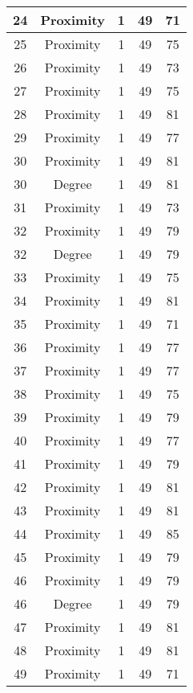 \documentclass[results.tex]{subfiles}
\begin{document}
\begin{center}
\begin{tabular}{| c || c | c | c | c |}
    \hline
    24 & Proximity & 1 & 49 & 71 \\ 
    \hline
    25 & Proximity & 1 & 49 & 75 \\ 
    \hline
    26 & Proximity & 1 & 49 & 73 \\ 
    \hline
    27 & Proximity & 1 & 49 & 75 \\ 
    \hline
    28 & Proximity & 1 & 49 & 81 \\ 
    \hline
    29 & Proximity & 1 & 49 & 77 \\ 
    \hline
    30 & Proximity & 1 & 49 & 81 \\ 
    \hline
    30 & Degree & 1 & 49 & 81 \\ 
    \hline
    31 & Proximity & 1 & 49 & 73 \\ 
    \hline
    32 & Proximity & 1 & 49 & 79 \\ 
    \hline
    32 & Degree & 1 & 49 & 79 \\ 
    \hline
    33 & Proximity & 1 & 49 & 75 \\ 
    \hline
    34 & Proximity & 1 & 49 & 81 \\ 
    \hline
    35 & Proximity & 1 & 49 & 71 \\ 
    \hline
    36 & Proximity & 1 & 49 & 77 \\ 
    \hline
    37 & Proximity & 1 & 49 & 77 \\ 
    \hline
    38 & Proximity & 1 & 49 & 75 \\ 
    \hline
    39 & Proximity & 1 & 49 & 79 \\ 
    \hline
    40 & Proximity & 1 & 49 & 77 \\ 
    \hline
    41 & Proximity & 1 & 49 & 79 \\ 
    \hline
    42 & Proximity & 1 & 49 & 81 \\ 
    \hline
    43 & Proximity & 1 & 49 & 81 \\ 
    \hline
    44 & Proximity & 1 & 49 & 85 \\ 
    \hline
    45 & Proximity & 1 & 49 & 79 \\ 
    \hline
    46 & Proximity & 1 & 49 & 79 \\ 
    \hline
    46 & Degree & 1 & 49 & 79 \\ 
    \hline
    47 & Proximity & 1 & 49 & 81 \\ 
    \hline
    48 & Proximity & 1 & 49 & 81 \\ 
    \hline
    49 & Proximity & 1 & 49 & 71 \\ 
    \hline   \end{tabular}
\end{center}
\end{document}
